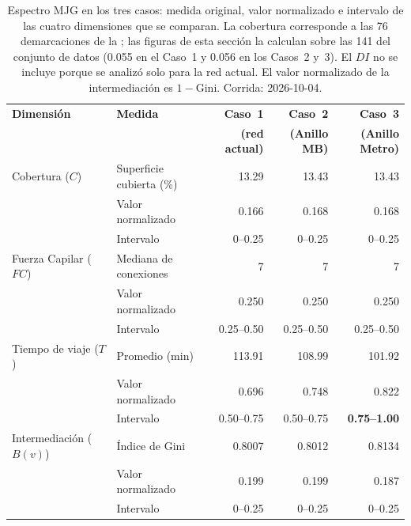 \begin{table}[H]
    \centering
    \caption[Espectro MJG en los tres casos]{%
    Espectro MJG en los tres casos: medida original, valor normalizado e
    intervalo de las cuatro dimensiones que se comparan. La cobertura
    corresponde a las 76 demarcaciones de la \zmvm{}; las figuras de esta
    sección la calculan sobre las 141 del conjunto de datos (0.055 en el
    Caso~1 y 0.056 en los Casos~2 y~3). El $DI$ no se incluye porque se
    analizó solo para la red actual. El valor normalizado de la
    intermediación es $1-\mathrm{Gini}$. Corrida: 2026-10-04.}
    \label{tab:anillo-espectro}
    \small
    \setlength{\tabcolsep}{4pt}
    \begin{tabularx}{\textwidth}{|l|X|r|r|r|}
        \hline
        \textbf{Dimensión} & \textbf{Medida} & \textbf{Caso~1} &
            \textbf{Caso~2} & \textbf{Caso~3} \\
        & & \textbf{(red actual)} & \textbf{(Anillo MB)} &
            \textbf{(Anillo Metro)} \\
        \hline
        Cobertura ($C$)      & Superficie cubierta (\%) & 13.29 & 13.43 & 13.43 \\
                             & Valor normalizado        & 0.166 & 0.168 & 0.168 \\
                             & Intervalo                & 0--0.25 & 0--0.25 & 0--0.25 \\
        \hline
        Fuerza Capilar ($FC$) & Mediana de conexiones   & 7 & 7 & 7 \\
                             & Valor normalizado        & 0.250 & 0.250 & 0.250 \\
                             & Intervalo                & 0.25--0.50 & 0.25--0.50 & 0.25--0.50 \\
        \hline
        Tiempo de viaje ($T$) & Promedio (min)          & 113.91 & 108.99 & 101.92 \\
                             & Valor normalizado        & 0.696 & 0.748 & 0.822 \\
                             & Intervalo                & 0.50--0.75 & 0.50--0.75 & \textbf{0.75--1.00} \\
        \hline
        Intermediación ($B(v)$) & Índice de Gini        & 0.8007 & 0.8012 & 0.8134 \\
                             & Valor normalizado        & 0.199 & 0.199 & 0.187 \\
                             & Intervalo                & 0--0.25 & 0--0.25 & 0--0.25 \\
        \hline
    \end{tabularx}
\end{table}

